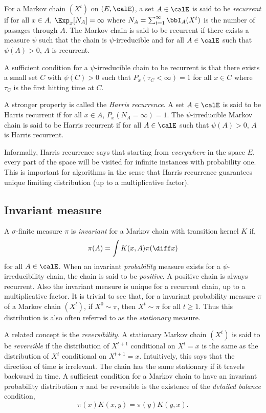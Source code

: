For a Markov chain $(X^t)$ on $(E,\calE)$, a set $A\in\calE$ is said to be \emph{recurrent} if for all $x\in A$, $\Exp_x[N_A] = \infty$ where $N_A = \sum_{t=1}^{\infty}\bbI_A(X^t)$ is the number of passages through $A$. The Markov chain is said to be recurrent if there exists a measure $\psi$ such that the chain is $\psi$-irreducible and for all $A\in\calE$ such that $\psi(A)>0$, $A$ is recurrent.

A sufficient condition for a $\psi$-irreducible chain to be recurrent is that there exists a small set $C$ with $\psi(C)>0$ such that $P_x(\tau_C<\infty) = 1$ for all $x\in C$ where $\tau_C$ is the first hitting time at $C$.

A stronger property is called the \emph{Harris recurrence}. A set $A\in\calE$ is said to be Harris recurrent if for all $x\in A$, $P_x(N_A = \infty) = 1$. The $\psi$-irreducible Markov chain is said to be Harris recurrent if for all $A\in\calE$ such that $\psi(A)>0$, $A$ is Harris recurrent.

Informally, Harris recurrence says that starting from \emph{everywhere} in the space $E$, every part of the space will be visited for infinite instances with probability one. This is important for \mcmc algorithms in the sense that Harris recurrence guarantees unique limiting distribution (up to a multiplicative factor).

\subsection{Invariant measure}
\label{sub: Appdendix Invariant measure}

A $\sigma$-finite measure $\pi$ is \emph{invariant} for a Markov chain with transition kernel $K$ if,
\begin{equation}
  \pi(A) = \int K(x,A)\pi(\diff x)
\end{equation}
for all $A\in\calE$. When an invariant \emph{probability} measure exists for a $\psi$-irreducibility chain, the chain is said to be \emph{positive}. A positive chain is always recurrent. Also the invariant measure is unique for a recurrent chain, up to a multiplicative factor. It is trivial to see that, for a invariant probability measure $\pi$ of a Markov chain $(X^t)$, if $X^0\sim\pi$, then $X^t\sim\pi$ for all $t\ge1$. Thus this distribution is also often referred to as the \emph{stationary} measure.

A related concept is the \emph{reversibility}. A stationary Markov chain $(X^t)$ is said to be \emph{reversible} if the distribution of $X^{t+1}$ conditional on $X^t = x$ is the same as the distribution of $X^t$ conditional on $X^{t+1} = x$. Intuitively, this says that the direction of time is irrelevant. The chain has the same stationary if it travels backward in time. A sufficient condition for a Markov chain to have an invariant probability distribution $\pi$ and be reversible is the existence of the \emph{detailed balance} condition,
\begin{equation}
  \pi(x)K(x,y) = \pi(y)K(y,x).
\end{equation}

